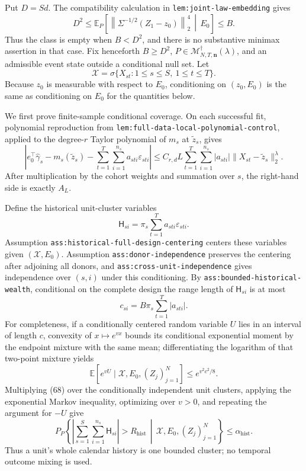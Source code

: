 Put \(D=Sd\).  The compatibility calculation in
\texttt{lem:joint-law-embedding} gives
\[
D^2\le
\mathbb E_P\!\left[
\left\|\Sigma^{-1/2}(Z_1-z_0)\right\|_2^4
\,\middle|\,E_0\right]
\le B.
\tag{66}
\]
Thus the class is empty when \(B<D^2\), and there is no substantive
minimax assertion in that case.  Fix henceforth \(B\ge D^2\),
\(P\in\mathcal M_{N,T,\mathbf n}^{\dagger}(\lambda)\), and an admissible
event state outside a conditional null set.  Let
\[
\mathscr X=\sigma\{X_{st}:1\le s\le S,\ 1\le t\le T\}.
\]
Because \(z_0\) is measurable with respect to \(E_0\), conditioning on
\((z_0,E_0)\) is the same as conditioning on \(E_0\) for the quantities
below.

We first prove finite-sample conditional coverage.  On each successful fit,
polynomial reproduction from \texttt{lem:full-data-local-polynomial-control},
applied to the degree-\(r\) Taylor polynomial of \(m_s\) at
\(\widetilde z_s\), gives
\[
\left|
e_0^\top\widehat\gamma_s-m_s(\widetilde z_s)
-\sum_{t=1}^{T}\sum_{i=1}^{n_s}a_{sti}\varepsilon_{sti}
\right|
\le
C_{r,d}L\sum_{t=1}^{T}\sum_{i=1}^{n_s}|a_{sti}|
\|X_{st}-\widetilde z_s\|_2^\lambda.
\tag{67}
\]
After multiplication by the cohort weights and summation over \(s\), the
right-hand side is exactly \(A_L\).

Define the historical unit-cluster variables
\[
\mathsf H_{si}=\pi_s\sum_{t=1}^{T}a_{sti}\varepsilon_{sti}.
\]
Assumption \texttt{ass:historical-full-design-centering} centers these
variables given \((\mathscr X,E_0)\).  Assumption
\texttt{ass:donor-independence} preserves the centering after adjoining all
donors, and \texttt{ass:cross-unit-independence} gives independence over
\((s,i)\) under this conditioning.  By
\texttt{ass:bounded-historical-wealth}, conditional on the complete design
the range length of \(\mathsf H_{si}\) is at most
\[
c_{si}=B\pi_s\sum_{t=1}^{T}|a_{sti}|.
\]
For completeness, if a conditionally centered random variable \(U\) lies in
an interval of length \(c\), convexity of \(x\mapsto e^{vx}\) bounds its
conditional exponential moment by the endpoint mixture with the same mean;
differentiating the logarithm of that two-point mixture yields
\[
\mathbb E[e^{vU}\mid\mathscr X,E_0,(Z_j)_{j=1}^{N}]
\le e^{v^2c^2/8}.
\tag{68}
\]
Multiplying (68) over the conditionally independent unit clusters, applying
the exponential Markov inequality, optimizing over \(v>0\), and repeating
the argument for \(-U\) give
\[
P_P\!\left\{
\left|\sum_{s=1}^{S}\sum_{i=1}^{n_s}\mathsf H_{si}\right|
>R_{\mathrm{hist}}
\,\middle|\,\mathscr X,E_0,(Z_j)_{j=1}^{N}
\right\}
\le\alpha_{\mathrm{hist}}.
\tag{69}
\]
Thus a unit's whole calendar history is one bounded cluster; no temporal
outcome mixing is used.

